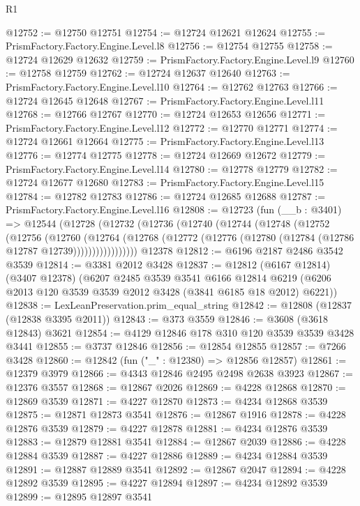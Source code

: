 \begin{lexlean}{R1}
\begin{coremodule}
@12752 := @12750 @12751
@12754 := @12724 @12621 @12624
@12755 := PrismFactory.Factory.Engine.Level.l8
@12756 := @12754 @12755
@12758 := @12724 @12629 @12632
@12759 := PrismFactory.Factory.Engine.Level.l9
@12760 := @12758 @12759
@12762 := @12724 @12637 @12640
@12763 := PrismFactory.Factory.Engine.Level.l10
@12764 := @12762 @12763
@12766 := @12724 @12645 @12648
@12767 := PrismFactory.Factory.Engine.Level.l11
@12768 := @12766 @12767
@12770 := @12724 @12653 @12656
@12771 := PrismFactory.Factory.Engine.Level.l12
@12772 := @12770 @12771
@12774 := @12724 @12661 @12664
@12775 := PrismFactory.Factory.Engine.Level.l13
@12776 := @12774 @12775
@12778 := @12724 @12669 @12672
@12779 := PrismFactory.Factory.Engine.Level.l14
@12780 := @12778 @12779
@12782 := @12724 @12677 @12680
@12783 := PrismFactory.Factory.Engine.Level.l15
@12784 := @12782 @12783
@12786 := @12724 @12685 @12688
@12787 := PrismFactory.Factory.Engine.Level.l16
@12808 := @12723
    (fun (__b : @3401) =>
    @12544
      (@12728
        (@12732
          (@12736
            (@12740
              (@12744
                (@12748
                  (@12752
                    (@12756
                      (@12760
                        (@12764
                          (@12768
                            (@12772 (@12776 (@12780 (@12784 (@12786 @12787 @12739)))))))))))))))))
    @12378
@12812 := @6196 @2187 @2486 @3542 @3539
@12814 := @3381 @2012 @3428
@12837 := @12812
    (@6167 @12814)
    (@3407 @12378)
    (@6207
      @2485
      @3539
      @3541
      @6166
      @12814
      @6219
      (@6206 @2013 @120 @3539 @3539 @2012 @3428 (@3841 @6185 @18 @2012) @6221))
@12838 := LexLeanPreservation.prim_equal_string
@12842 := @12808 (@12837 (@12838 @3395 @2011))
@12843 := @373 @3559
@12846 := @3608 (@3618 @12843) @3621
@12854 := @4129 @12846 @178 @310 @120 @3539 @3539 @3428 @3441
@12855 := @3737 @12846
@12856 := @12854 @12855
@12857 := @7266 @3428
@12860 := @12842 (fun ("_" : @12380) => @12856 @12857)
@12861 := @12379 @3979
@12866 := @4343 @12846 @2495 @2498 @2638 @3923
@12867 := @12376 @3557
@12868 := @12867 @2026
@12869 := @4228 @12868
@12870 := @12869 @3539
@12871 := @4227 @12870
@12873 := @4234 @12868 @3539
@12875 := @12871 @12873 @3541
@12876 := @12867 @1916
@12878 := @4228 @12876 @3539
@12879 := @4227 @12878
@12881 := @4234 @12876 @3539
@12883 := @12879 @12881 @3541
@12884 := @12867 @2039
@12886 := @4228 @12884 @3539
@12887 := @4227 @12886
@12889 := @4234 @12884 @3539
@12891 := @12887 @12889 @3541
@12892 := @12867 @2047
@12894 := @4228 @12892 @3539
@12895 := @4227 @12894
@12897 := @4234 @12892 @3539
@12899 := @12895 @12897 @3541

\end{coremodule}
\end{lexlean}
